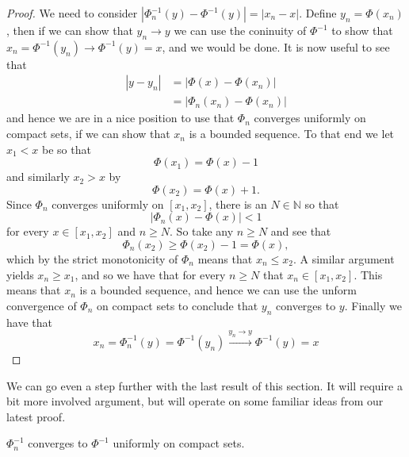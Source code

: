 \documentclass[11pt, a4paper]{article}
\begin{document}
\begin{appendix}
\begin{proof}
We need to consider $|\Phi_n^{-1}(y) - \Phi^{-1}(y)| = |x_n - x|$. Define $y_n = \Phi(x_n)$, then if we can show that $y_n \to y$ we can use the coninuity of $\Phi^{-1}$  to show that $x_n = \Phi^{-1}(y_n) \to \Phi^{-1}(y) = x$, and we would be done. It is now useful to see that
\begin{align*}
|y-y_n| &= |\Phi(x) - \Phi(x_n)| \\
	&= |\Phi_n(x_n) - \Phi(x_n)|
\end{align*}
and hence we are in a nice position to use that $\Phi_n$ converges uniformly on compact sets, if we can show that $x_n$ is a bounded sequence. To that end we let $x_1<x$ be so that
\begin{equation*}
\Phi(x_1) = \Phi(x) -1
\end{equation*}
and similarly $x_2 > x$ by
\begin{equation*}
\Phi(x_2) = \Phi(x) +1.
\end{equation*}
Since $\Phi_n$ converges uniformly on $[x_1, x_2]$, there is an $N \in \mathbb{N}$ so that
\begin{equation*}
|\Phi_n(x) - \Phi(x)| < 1
\end{equation*} 
for every $x \in [x_1, x_2]$ and $n \geq N$. So take any $n \geq N$ and see that
\begin{equation*}
\Phi_n(x_2) \geq \Phi(x_2) - 1 = \Phi(x),
\end{equation*}
which by the strict monotonicity of $\Phi_n$ means that $x_n \leq x_2$. A similar argument yields $x_n \geq x_1$, and so we have that for every $n \geq N$ that $x_n \in [x_1, x_2]$. This means that $x_n$ is a bounded sequence, and hence we can use the unform convergence of $\Phi_n$ on compact sets to conclude that $y_n$ converges to $y$. Finally we have that
\begin{equation*}
x_n = \Phi_n^{-1} (y) = \Phi^{-1}(y_n) \overset{y_n\to y}{\to} \Phi^{-1}(y) = x
\end{equation*}
\end{proof}

We can go even a step further with the last result of this section. It will require a bit more involved argument, but will operate on some familiar ideas from our latest proof.

\begin{proposition}
\label{prop:inverse_uniform}
$\Phi_n^{-1}$ converges to $\Phi^{-1}$ uniformly on compact sets.
\end{proposition}


\end{appendix}
\end{document}
